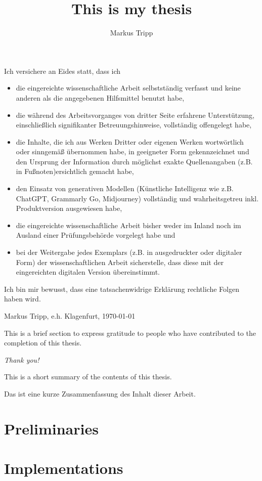 \documentclass[twoside, withdegree, numbers = noenddot]{bhxmtthesis}
\title{This is my thesis}
\author{Markus Tripp}
\begin{document}
\maketitle

Ich versichere an Eides statt, dass ich
\begin{itemize}
	\item die eingereichte wissenschaftliche Arbeit selbstständig verfasst und keine anderen als die angegebenen Hilfsmittel benutzt habe,
	\item die während des Arbeitsvorganges von dritter Seite erfahrene Unterstützung, einschließlich signifikanter Betreuungshinweise, vollständig offengelegt habe,
	\item die Inhalte, die ich aus Werken Dritter oder eigenen Werken wortwörtlich oder sinngemäß übernommen habe, in geeigneter Form gekennzeichnet und den Ursprung der Information durch 	möglichst exakte Quellenangaben (z.B. in Fußnoten)ersichtlich gemacht habe,
	\item den Einsatz von generativen Modellen (Künstliche Intelligenz wie z.B. ChatGPT, Grammarly Go, Midjourney) vollständig und wahrheitsgetreu inkl. Produktversion ausgewiesen habe,
	\item die eingereichte wissenschaftliche Arbeit bisher weder im Inland noch im Ausland einer Prüfungsbehörde vorgelegt habe und
	\item bei der Weitergabe jedes Exemplars (z.B. in ausgedruckter oder digitaler Form) der wissenschaftlichen Arbeit sicherstelle, dass diese mit der eingereichten digitalen Version 		übereinstimmt.
\end{itemize}
Ich bin mir bewusst, dass eine tatsachenwidrige Erklärung rechtliche Folgen haben wird.

\vspace{4\baselineskip}

Markus Tripp, e.h. \hfill Klagenfurt, \today

This is a brief section to express gratitude to people who have contributed to the completion of this thesis.

\begin{center} 
\emph{Thank you!}
\end{center}

This is a short summary of the contents of this thesis.

\vspace{4\baselineskip} {\let\clearpage\relax {}} %
Das ist eine kurze Zusammenfassung des Inhalt dieser Arbeit.

\tableofcontents



\chapter{Preliminaries}\label{chap:preliminaries}


\appendix
\chapter{Implementations}\label{chap:implementations}


\printbibliography
\end{document}
